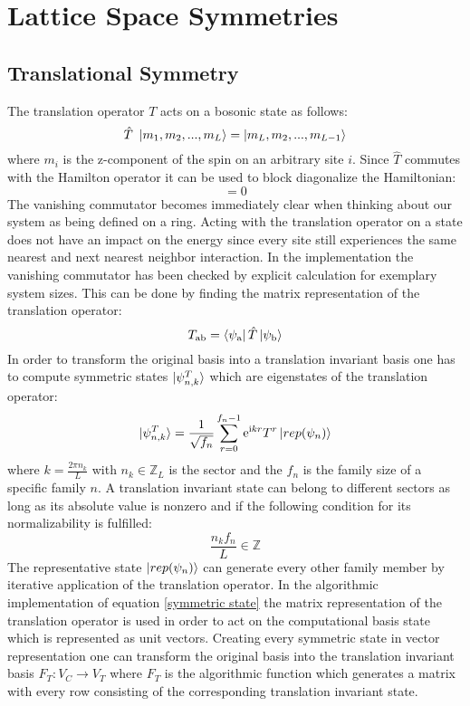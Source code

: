 \documentclass{scrartcl}
\begin{document}
\section{Lattice Space Symmetries}
\subsection{Translational Symmetry}
The translation operator $T$ acts on a bosonic state as follows:
\begin{equation*}
    \hat{T}\ \ket{m_1,m_2,...,m_L}=\ket{m_L,m_2,...,m_{L-1}}
\end{equation*}
where $m_i$ is the z-component of the spin on an arbitrary site $i$. Since $\hat{T}$ commutes with the Hamilton operator it can be used to block diagonalize the Hamiltonian:
\begin{equation*}
    [\hat{H},\hat{T}]=0
\end{equation*}
The vanishing commutator becomes immediately clear when thinking about our system as being defined on a ring. Acting with the translation operator on a state does not have an impact on the energy since every site still experiences the same nearest and next nearest neighbor interaction. In the implementation the vanishing commutator has been checked by explicit calculation for exemplary system sizes. This can be done by finding the matrix representation of the translation operator:
\begin{equation}
    T_{\mathrm{ab}}=\bra{\psi_\mathrm{a}} \hat{T} \ket{\psi_\mathrm{b}}
    \label{Tmatrix}
\end{equation}
\newpage \noindent In order to transform the original basis into a translation invariant basis one has to compute symmetric states $\ket{\psi_{n,k}^T}$ which are eigenstates of the translation operator:
\begin{equation}
    \ket{\psi_{n,k}^T}=\frac{1}{\sqrt{f_n}} \sum ^{f_n-1}_{r=0} \mathrm{e}^{\mathrm{i}kr} T^r \ket{rep(\psi_n)}
    \label{symmetric state}
\end{equation}
where $k=\frac{2\pi n_k}{L}$ with $n_k \in \mathbb{Z}_L$ is the sector and the $f_n$ is the family size of a specific family $n$. A translation invariant state can belong to different sectors as long as its absolute value is nonzero and if the following condition for its normalizability is fulfilled:
\begin{equation*}
    \frac{n_k f_n}{L}\in \mathbb{Z}
\end{equation*}
 The representative state $\ket{rep(\psi_n)}$ can generate every other family member by iterative application of the translation operator. In the algorithmic implementation of equation \ref{symmetric state} the matrix representation of the translation operator is used in order to act on the computational basis state which is represented as unit vectors. Creating every symmetric state in vector representation one can transform the original basis into the translation invariant basis $F_T:V_C \rightarrow V_T $ where $F_T$ is the algorithmic function which generates a matrix with every row consisting of the corresponding translation invariant state.
\end{document}
